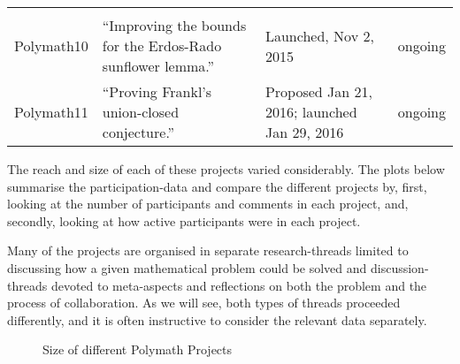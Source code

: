 \documentclass[article, floatfix, groupaddress, prb]{revtex4-1}
\begin{document}
\begin{longtable}[c]{@{}llll@{}}
\begin{minipage}[t]{0.09\columnwidth}
\strut\end{minipage}\tabularnewline
\begin{minipage}[t]{0.11\columnwidth}\raggedright\strut
Polymath10
\strut\end{minipage} &
\begin{minipage}[t]{0.10\columnwidth}\raggedright\strut
``Improving the bounds for the Erdos-Rado sunflower lemma.''
\strut\end{minipage} &
\begin{minipage}[t]{0.09\columnwidth}\raggedright\strut
Launched, Nov 2, 2015
\strut\end{minipage} &
\begin{minipage}[t]{0.09\columnwidth}\raggedright\strut
ongoing
\strut\end{minipage}\tabularnewline
\begin{minipage}[t]{0.11\columnwidth}\raggedright\strut
Polymath11
\strut\end{minipage} &
\begin{minipage}[t]{0.10\columnwidth}\raggedright\strut
``Proving Frankl's union-closed conjecture.''
\strut\end{minipage} &
\begin{minipage}[t]{0.09\columnwidth}\raggedright\strut
Proposed Jan 21, 2016; launched Jan 29, 2016
\strut\end{minipage} &
\begin{minipage}[t]{0.09\columnwidth}\raggedright\strut
ongoing
\strut\end{minipage}\tabularnewline
\bottomrule
\end{longtable}

The reach and size of each of these projects varied considerably. The
plots below summarise the participation-data and compare the different
projects by, first, looking at the number of participants and comments
in each project, and, secondly, looking at how active participants were
in each project.

Many of the projects are organised in separate research-threads limited
to discussing how a given mathematical problem could be solved and
discussion-threads devoted to meta-aspects and reflections on both the
problem and the process of collaboration. As we will see, both types of
threads proceeded differently, and it is often instructive to consider
the relevant data separately.



    \begin{figure*}
        \begin{center}\end{center}
        \caption{Size of different Polymath Projects}
        \label{fig:overview}
    \end{figure*}
    
\end{document}
